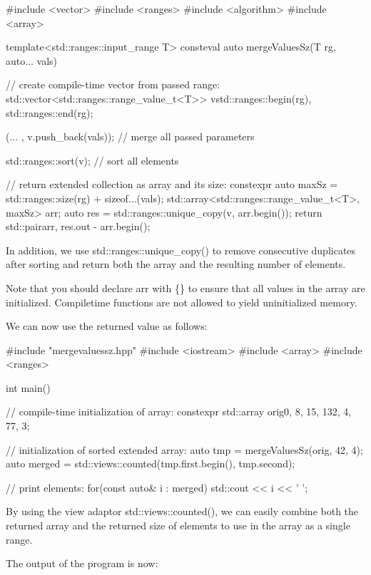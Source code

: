 
\begin{cpp}
#include <vector>
#include <ranges>
#include <algorithm>
#include <array>

template<std::ranges::input_range T>
consteval auto mergeValuesSz(T rg, auto... vals)
{
	// create compile-time vector from passed range:
	std::vector<std::ranges::range_value_t<T>> v{std::ranges::begin(rg),
												 std::ranges::end(rg)};
												 
	(... , v.push_back(vals)); // merge all passed parameters
	
	std::ranges::sort(v); // sort all elements
	
	// return extended collection as array and its size:
	constexpr auto maxSz = std::ranges::size(rg) + sizeof...(vals);
	std::array<std::ranges::range_value_t<T>, maxSz> arr{};
	auto res = std::ranges::unique_copy(v, arr.begin());
	return std::pair{arr, res.out - arr.begin()};
}
\end{cpp}

In addition, we use std::ranges::unique\_copy() to remove consecutive duplicates after sorting and return both the array and the resulting number of elements.

Note that you should declare arr with \{\} to ensure that all values in the array are initialized. Compiletime functions are not allowed to yield uninitialized memory.

We can now use the returned value as follows:


\begin{cpp}
#include "mergevaluessz.hpp"
#include <iostream>
#include <array>
#include <ranges>

int main()
{
	// compile-time initialization of array:
	constexpr std::array orig{0, 8, 15, 132, 4, 77, 3};
	
	// initialization of sorted extended array:
	auto tmp = mergeValuesSz(orig, 42, 4);
	auto merged = std::views::counted(tmp.first.begin(), tmp.second);
	
	// print elements:
	for(const auto& i : merged) {
		std::cout << i << ' ';
	}
}
\end{cpp}

By using the view adaptor std::views::counted(), we can easily combine both the returned array and the returned size of elements to use in the array as a single range.

The output of the program is now:

